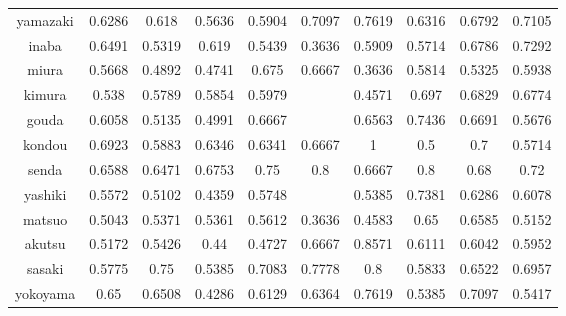 \documentclass[11pt,a4paper,dvipdfmx]{jsarticle}
\begin{document}
\begin{tabular}{c||c|c|c|c|c|c|c|c|c}
    yamazaki & 0.6286 & 0.618 & 0.5636 & 0.5904 & 0.7097 & 0.7619 & 0.6316 & 0.6792 & 0.7105 \\
    inaba & 0.6491 & 0.5319 & 0.619 & 0.5439 & 0.3636 & 0.5909 & 0.5714 & 0.6786 & 0.7292 \\
    miura & 0.5668 & 0.4892 & 0.4741 & 0.675 & 0.6667 & 0.3636 & 0.5814 & 0.5325 & 0.5938 \\
    kimura & 0.538 & 0.5789 & 0.5854 & 0.5979 &  & 0.4571 & 0.697 & 0.6829 & 0.6774 \\
    gouda & 0.6058 & 0.5135 & 0.4991 & 0.6667 &  & 0.6563 & 0.7436 & 0.6691 & 0.5676 \\
    kondou & 0.6923 & 0.5883 & 0.6346 & 0.6341 & 0.6667 & 1 & 0.5 & 0.7 & 0.5714 \\
    senda & 0.6588 & 0.6471 & 0.6753 & 0.75 & 0.8 & 0.6667 & 0.8 & 0.68 & 0.72 \\
    yashiki & 0.5572 & 0.5102 & 0.4359 & 0.5748 &  & 0.5385 & 0.7381 & 0.6286 & 0.6078 \\
    matsuo & 0.5043 & 0.5371 & 0.5361 & 0.5612 & 0.3636 & 0.4583 & 0.65 & 0.6585 & 0.5152 \\
    akutsu & 0.5172 & 0.5426 & 0.44 & 0.4727 & 0.6667 & 0.8571 & 0.6111 & 0.6042 & 0.5952 \\
    sasaki & 0.5775 & 0.75 & 0.5385 & 0.7083 & 0.7778 & 0.8 & 0.5833 & 0.6522 & 0.6957 \\
    yokoyama & 0.65 & 0.6508 & 0.4286 & 0.6129 & 0.6364 & 0.7619 & 0.5385 & 0.7097 & 0.5417 \\
    
    
\end{tabular}
\end{document}
